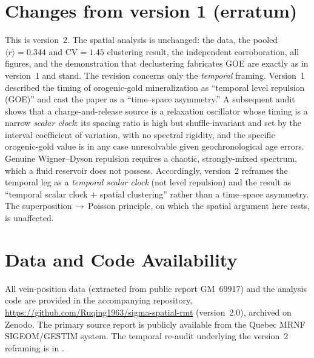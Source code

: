 \documentclass[11pt]{article}
\begin{document}
\section*{Changes from version 1 (erratum)}
This is version~2. The spatial analysis is unchanged: the data, the pooled
$\langle r\rangle=0.344$ and $\mathrm{CV}=1.45$ clustering result, the independent
corroboration, all figures, and the demonstration that declustering fabricates
GOE are exactly as in version~1 and stand. The revision concerns only the
\emph{temporal} framing. Version~1 described the timing of orogenic-gold
mineralization as ``temporal level repulsion (GOE)'' and cast the paper as a
``time--space asymmetry.'' A subsequent audit \citep{chen2026audit} shows that a
charge-and-release source is a relaxation oscillator whose timing is a narrow
\emph{scalar clock}: its spacing ratio is high but shuffle-invariant and set by
the interval coefficient of variation, with no spectral rigidity, and the
specific orogenic-gold value is in any case unresolvable given geochronological
age errors. Genuine Wigner--Dyson repulsion requires a chaotic, strongly-mixed
spectrum, which a fluid reservoir does not possess. Accordingly, version~2
reframes the temporal leg as a \emph{temporal scalar clock} (not level repulsion)
and the result as ``temporal scalar clock $+$ spatial clustering'' rather than a
time--space asymmetry. The superposition$\,\to\,$Poisson principle, on which the
spatial argument here rests, is unaffected.

\section*{Data and Code Availability}
All vein-position data (extracted from public report GM~69917) and the analysis
code are provided in the accompanying repository,
\url{https://github.com/Ruqing1963/sigma-spatial-rmt} (version~2.0), archived on
Zenodo. The primary source report is publicly available from the Quebec MRNF
SIGEOM/GESTIM system. The temporal re-audit underlying the version~2 reframing is
in \citet{chen2026audit}.
\end{document}
